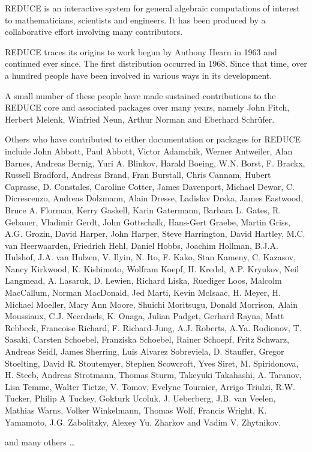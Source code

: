 REDUCE is an interactive system for general algebraic computations of 
interest to mathematicians, scientists and engineers. 
It has been produced by a collaborative effort involving many contributors.

REDUCE traces its origins to work begun by Anthony Hearn in 1963 and 
continued ever since. The first distribution occurred in 1968. 
Since that time, over a hundred people have been involved in various ways 
in its development.

A small number of these people have made sustained contributions to the REDUCE 
core and associated packages over many years, namely John Fitch, 
Herbert Melenk, Winfried Neun, Arthur Norman and Eberhard Schr\"ufer.


Others who have contributed to either documentation or packages for REDUCE 
include John Abbott, Paul Abbott, Victor Adamchik, Werner Antweiler, 
Alan Barnes, Andreas Bernig, Yuri A. Blinkov, Harald Boeing, W.N. Borst, 
F. Brackx, Russell Bradford, Andreas Brand, Fran Burstall, Chris Cannam, 
Hubert Caprasse, D. Constales, Caroline Cotter, James Davenport,  
Michael Dewar, C. Dicrescenzo, Andreas Dolzmann, Alain Dresse, 
Ladislav Drska, James Eastwood, Bruce A. Florman, Kerry Gaskell, 
Karin Gatermann, Barbara L. Gates, R. Gebauer, Vladimir Gerdt, 
John Gottschalk, Hans-Gert Graebe,  Martin Griss, A.G. Grozin, 
David Harper, John Harper, Steve Harrington, David Hartley, 
M.C. van Heerwaarden, Friedrich Hehl, Daniel Hobbs, Joachim Hollman, 
B.J.A. Hulshof, J.A. van Hulzen, V. Ilyin, N. Ito, F. Kako, 
Stan Kameny, C. Kazasov, Nancy Kirkwood, K. Kishimoto, Wolfram Koepf, 
H. Kredel, A.P. Kryukov, Neil Langmead, A. Lasaruk, D. Lewien, 
Richard Liska, Ruediger Loos, Malcolm MacCallum, Norman MacDonald, 
Jed Marti, Kevin McIsaac, H. Meyer, H. Michael Moeller, Mary Ann Moore, 
Shuichi Moritsugu, Donald Morrison, Alain Moussiaux, C.J. Neerdaels, 
K. Onaga, Julian Padget, Gerhard Rayna, Matt Rebbeck, Francoise Richard, 
F. Richard-Jung, A.J. Roberts, A.Ya. Rodionov, T. Sasaki, Carsten Schoebel, 
Franziska Schoebel, Rainer Schoepf, Fritz Schwarz, Andreas Seidl, 
James Sherring, Luis Alvarez Sobreviela, D. Stauffer, Gregor Stoelting, 
David R. Stoutemyer, Stephen Scowcroft, Yves Siret, M. Spiridonova, 
H. Steeb, Andreas Strotmann, Thomas Sturm, Takeyuki Takahashi, 
A. Taranov, Lisa Temme, Walter Tietze, V. Tomov, Evelyne Tournier, 
Arrigo Triulzi, R.W. Tucker, Philip A Tuckey, Gokturk Ucoluk, 
J. Ueberberg, J.B. van Veelen, Mathias Warns, Volker Winkelmann, 
Thomas Wolf, Francis Wright, K. Yamamoto, J.G. Zabolitzky, 
Alexey Yu. Zharkov and Vadim V. Zhytnikov.

and many others \ldots



